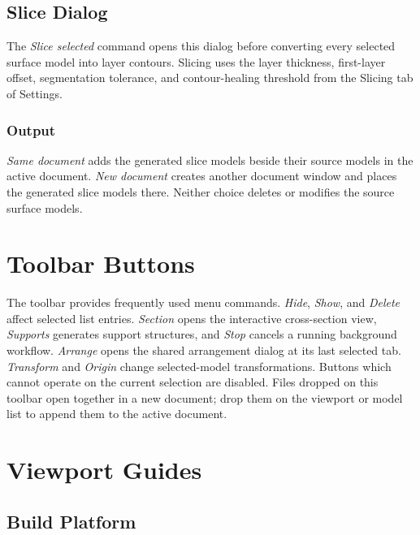 \subsection{Slice Dialog}
\label{slice-dialog}

The \emph{Slice selected} command opens this dialog before converting every
selected surface model into layer contours. Slicing uses the layer thickness,
first-layer offset, segmentation tolerance, and contour-healing threshold from
the Slicing tab of Settings.

\subsubsection{Output}
\label{slice-output}

\emph{Same document} adds the generated slice models beside their source
models in the active document. \emph{New document} creates another document
window and places the generated slice models there. Neither choice deletes or
modifies the source surface models.

\section{Toolbar Buttons}
\label{document-toolbar}

The toolbar provides frequently used menu commands. \emph{Hide},
\emph{Show}, and \emph{Delete} affect selected list entries. \emph{Section}
opens the interactive cross-section view, \emph{Supports} generates support
structures, and \emph{Stop} cancels a running background workflow.
\emph{Arrange} opens the shared arrangement dialog at its last selected tab.
\emph{Transform} and \emph{Origin} change selected-model transformations.
Buttons which cannot operate on the current selection are disabled. Files
dropped on this toolbar open together in a new document; drop them on the
viewport or model list to append them to the active document.

\section{Viewport Guides}
\label{viewport}

\subsection{Build Platform}

